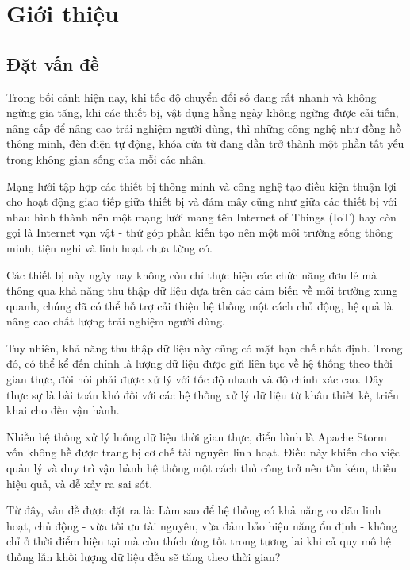 \chapter{Giới thiệu}

\section{Đặt vấn đề}

Trong bối cảnh hiện nay, khi tốc độ chuyển đổi số đang rất nhanh và không ngừng gia tăng, khi các thiết bị, vật dụng hằng ngày không ngừng được cải tiến, nâng cấp để nâng cao trải nghiệm người dùng, thì những công nghệ như đồng hồ thông minh, đèn điện tự động, khóa cửa từ đang dần trở thành một phần tất yếu trong không gian sống của mỗi các nhân.

Mạng lưới tập hợp các thiết bị thông minh và công nghệ tạo điều kiện thuận lợi cho hoạt động giao tiếp giữa thiết bị và đám mây cũng như giữa các thiết bị với nhau hình thành nên một mạng lưới mang tên Internet of Things (IoT) hay còn gọi là Internet vạn vật - thứ góp phần kiến tạo nên một môi trường sống thông minh, tiện nghi và linh hoạt chưa từng có.

Các thiết bị này ngày nay không còn chỉ thực hiện các chức năng đơn lẻ mà thông qua khả năng thu thập dữ liệu dựa trên các cảm biến về môi trường xung quanh, chúng đã có thể hỗ trợ cải thiện hệ thống một cách chủ động, hệ quả là nâng cao chất lượng trải nghiệm người dùng.


Tuy nhiên, khả năng thu thập dữ liệu này cũng có mặt hạn chế nhất định. Trong đó, có thể kể đến chính là lượng dữ liệu được gửi liên tục về hệ thống theo thời gian thực, đòi hỏi phải được xử lý với tốc độ nhanh và độ chính xác cao. Đây thực sự là bài toán khó đối với các hệ thống xử lý dữ liệu từ khâu thiết kế, triển khai cho đến vận hành.

Nhiều hệ thống xử lý luồng dữ liệu thời gian thực, điển hình là Apache Storm vốn không hề được trang bị cơ chế tài nguyên linh hoạt. Điều này khiến cho việc quản lý và duy trì vận hành hệ thống một cách thủ công trở nên tốn kém, thiếu hiệu quả, và dễ xảy ra sai sót.

Từ đây, vấn đề được đặt ra là: Làm sao để hệ thống có khả năng co dãn linh hoạt, chủ động - vừa tối ưu tài nguyên, vừa đảm bảo hiệu năng ổn định - không chỉ ở thời điểm hiện tại mà còn thích ứng tốt trong tương lai khi cả quy mô hệ thống lẫn khối lượng dữ liệu đều sẽ tăng theo thời gian?

